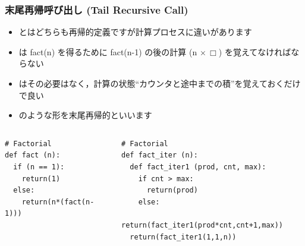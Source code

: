 \begin{frame}
\frametitle{末尾再帰呼び出し (Tail Recursive Call)}
  \begin{itemize}
\item {}とはどちらも再帰的定義ですが計算プロセスに違いがあります
\item {} は fact(n) を得るために fact(n-1) の後の計算 (n  $\times\,\Box$) を覚えてなければならない
\item {} はその必要はなく，計算の状態``カウンタと途中までの積''を覚えておくだけで良い
\item {} のような形を末尾再帰的といいます
　 \end{itemize}
\vspace{-2em}
  \begin{columns}[t]
    \begin{column}{0.45\textwidth}
      \begin{lstlisting}[caption={fact.py},label=fact-rec1]
# Factorial
def fact (n):
  if (n == 1):
    return(1)
  else:
    return(n*(fact(n-1)))
      \end{lstlisting}
    \end{column}
    \begin{column}{0.5\textwidth}
      \begin{lstlisting}[firstnumber=13,caption={fact.py},label=fact-iter]
# Factorial
def fact_iter (n):
  def fact_iter1 (prod, cnt, max):
    if cnt > max:
      return(prod)
    else:
      return(fact_iter1(prod*cnt,cnt+1,max))
  return(fact_iter1(1,1,n))
      \end{lstlisting}
    \end{column}
  \end{columns}
\end{frame}
